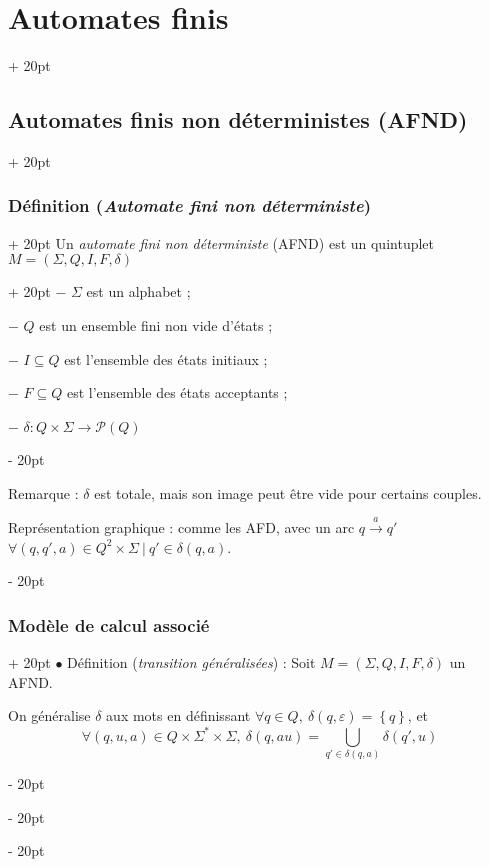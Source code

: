 \documentclass[a4paper, 12pt, twoside]{article}
\newcommand{\set}[1]{\left\{ #1 \right\}}
\newcommand{\ind}[1][20pt]{\advance\leftskip + #1}
\newcommand{\deind}[1][20pt]{\advance\leftskip - #1}
\newenvironment{indt}[2][20pt]{#2 \par \ind[#1]}{\par \deind} %
\begin{document}
\begin{indt}{\section{Automates finis}}
\begin{indt}{\subsection{Automates finis non déterministes (AFND)}}
            \begin{indt}{\subsubsection{Définition (\textit{Automate fini non déterministe})}}
                \begin{indt}{Un \emph{automate fini non déterministe} (AFND) est un quintuplet $M = (\Sigma, Q, I, F, \delta)$}
                    $-$ $\Sigma$ est un alphabet ;

                    $-$ $Q$ est un ensemble fini non vide d'états ;

                    $-$ $I \subseteq Q$ est l'ensemble des états initiaux ;

                    $-$ $F \subseteq Q$ est l'ensemble des états acceptants ;

                    $-$ $\delta : Q \times \Sigma \longrightarrow \mathcal P(Q)$
                \end{indt}

                \vspace{12pt}
                
                Remarque : $\delta$ est totale, mais son image peut être vide pour certains couples.

                \vspace{12pt}
                
                Représentation graphique : comme les AFD, avec un arc $q \overset a \longrightarrow q'$ $\forall (q, q', a) \in Q^2 \times \Sigma\ |\ q' \in \delta(q, a)$.
            \end{indt}

            \vspace{12pt}
            
            \begin{indt}{\subsubsection{Modèle de calcul associé}}
                $\bullet$ Définition (\emph{transition généralisées}) : Soit $M = (\Sigma, Q, I, F, \delta)$ un AFND.

                On généralise $\delta$ aux mots en définissant $\forall q \in Q,\ \delta(q, \varepsilon) = \set q$, et
                \[
                    \forall (q, u, a) \in Q \times \Sigma^* \times \Sigma,\
                    \delta(q, au) = \bigcup_{q' \in \delta(q, a)} \delta(q', u)
                \]


\end{indt}
\end{indt}
\end{indt}
\end{document}
